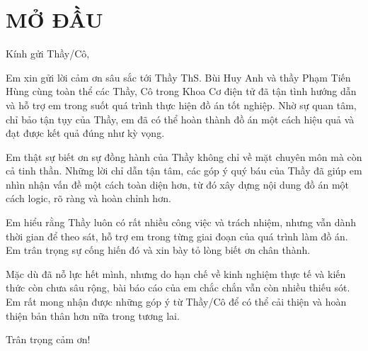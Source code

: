 \newcommand{\AbstractName}{MỞ ĐẦU}
\chapter*{\AbstractName}
\addcontentsline{toc}{chapter}{\AbstractName}

Kính gửi Thầy/Cô,

Em xin gửi lời cảm ơn sâu sắc tới Thầy ThS. Bùi Huy Anh và thầy Phạm Tiến Hùng cùng toàn thể các Thầy, Cô trong Khoa Cơ điện tử đã tận tình hướng dẫn và hỗ trợ em trong suốt quá trình thực hiện đồ án tốt nghiệp. Nhờ sự quan tâm, chỉ bảo tận tụy của Thầy, em đã có thể hoàn thành đồ án một cách hiệu quả và đạt được kết quả đúng như kỳ vọng. 

Em thật sự biết ơn sự đồng hành của Thầy không chỉ về mặt chuyên môn mà còn cả tinh thần. Những lời chỉ dẫn tận tâm, các góp ý quý báu của Thầy đã giúp em nhìn nhận vấn đề một cách toàn diện hơn, từ đó xây dựng nội dung đồ án một cách logic, rõ ràng và hoàn chỉnh hơn. 

Em hiểu rằng Thầy luôn có rất nhiều công việc và trách nhiệm, nhưng vẫn dành thời gian để theo sát, hỗ trợ em trong từng giai đoạn của quá trình làm đồ án. Em trân trọng sự cống hiến đó và xin bày tỏ lòng biết ơn chân thành. 

Mặc dù đã nỗ lực hết mình, nhưng do hạn chế về kinh nghiệm thực tế và kiến thức còn chưa sâu rộng, bài báo cáo của em chắc chắn vẫn còn nhiều thiếu sót. Em rất mong nhận được những góp ý từ Thầy/Cô để có thể cải thiện và hoàn thiện bản thân hơn nữa trong tương lai.

Trân trọng cảm ơn!